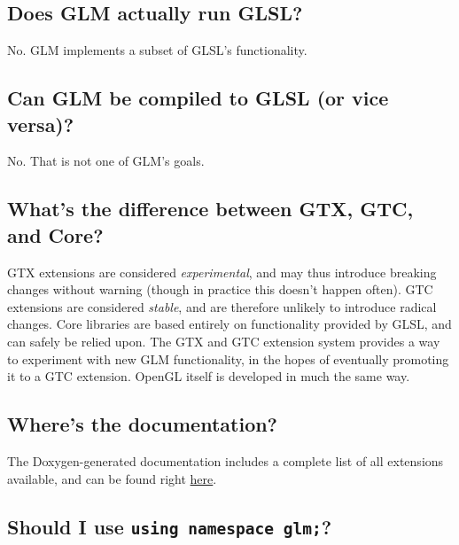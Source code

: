 \documentclass{scrartcl}
\numberwithin{figure}{subsection}
\begin{document}
\subsection{Does GLM actually run GLSL?}

No.  GLM implements a subset of GLSL's functionality.

\subsection{Can GLM be compiled to GLSL (or vice versa)?}

No.  That is not one of GLM's goals.

\subsection{What's the difference between GTX, GTC, and Core?}

GTX extensions are considered \emph{experimental}, and may thus introduce breaking changes without warning (though in practice this doesn't happen often).  GTC extensions are considered \emph{stable}, and are therefore unlikely to introduce radical changes.  Core libraries are based entirely on functionality provided by GLSL, and can safely be relied upon.  The GTX and GTC extension system provides a way to experiment with new GLM functionality, in the hopes of eventually promoting it to a GTC extension.  OpenGL itself is developed in much the same way.

%
%

\subsection{Where's the documentation?}

The Doxygen-generated documentation includes a complete list of all extensions available, and can be found right \href{http://glm.g-truc.net/html/index.html}{here}.

\subsection{Should I use \texttt{using namespace glm;}?}
\end{document}
